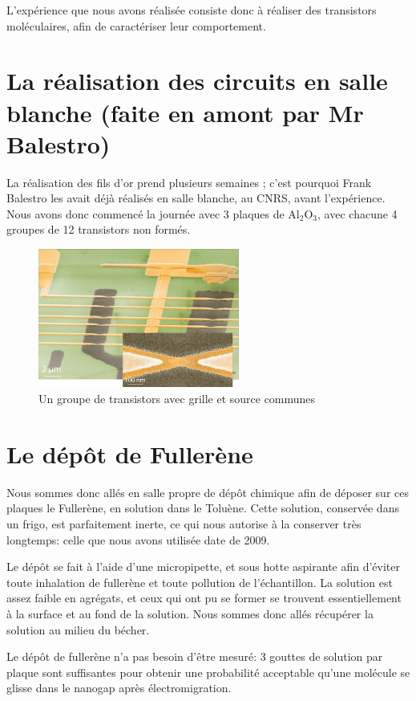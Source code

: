 L'expérience que nous avons réalisée consiste donc à réaliser des transistors moléculaires, afin de caractériser leur comportement.
\section{La réalisation des circuits en salle blanche (faite en amont par Mr Balestro)}
La réalisation des fils d'or prend plusieurs semaines ; c'est pourquoi Frank Balestro les avait déjà réalisés en salle blanche, au CNRS, avant l'expérience.
Nous avons donc commencé la journée avec 3 plaques de Al$_2$O$_3$, avec chacune 4 groupes de 12 transistors non formés.
\begin{figure}[h]
    \begin{center}
        \includegraphics[width=250px]{Images/3_GroupeDeTransistors}
        \caption{Un groupe de transistors avec grille et source communes}
    \end{center}
\end{figure}
\section{Le dépôt de Fullerène}
Nous sommes donc allés en salle propre de dépôt chimique afin de déposer sur ces plaques le Fullerène, en solution dans le Toluène.
Cette solution, conservée dans un frigo, est parfaitement inerte, ce qui nous autorise à la conserver très longtemps: celle que nous avons utilisée date de 2009.\medskip 

Le dépôt se fait à l'aide d'une micropipette, et sous hotte aspirante afin d'éviter toute inhalation de fullerène et toute pollution de l'échantillon.
La solution est assez faible en agrégats, et ceux qui ont pu se former se trouvent essentiellement à la surface et au fond de la solution. Nous sommes donc allés récupérer la solution au milieu du bécher.

Le dépôt de fullerène n'a pas besoin d'être mesuré: 3 gouttes de solution par plaque sont suffisantes pour obtenir une probabilité acceptable qu'une molécule se glisse dans le nanogap après électromigration.

